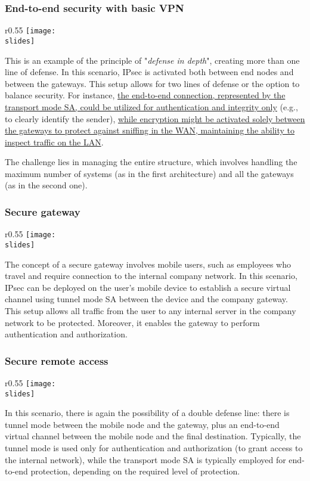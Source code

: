 \subsubsection{End-to-end security with basic VPN}
\begin{wrapfigure}{r}{0.55\textwidth}
    \centering
    \texttt{[image: \\slides]}
\end{wrapfigure}
This is an example of the principle of "\textit{defense in depth}", creating more than one line of defense. In this scenario, IPsec is activated both between end nodes and between the gateways. This setup allows for two lines of defense or the option to balance security. For instance, \ul{the end-to-end connection, represented by the transport mode SA, could be utilized for authentication and integrity only} (e.g., to clearly identify the sender), \ul{while encryption might be activated solely between the gateways to protect against sniffing in the WAN, maintaining the ability to inspect traffic on the LAN}.

The challenge lies in managing the entire structure, which involves handling the maximum number of systems (as in the first architecture) and all the gateways (as in the second one).




\subsubsection{Secure gateway}
\begin{wrapfigure}{r}{0.55\textwidth}
    \centering
    \texttt{[image: \\slides]}
\end{wrapfigure}
The concept of a secure gateway involves mobile users, such as employees who travel and require connection to the internal company network. In this scenario, IPsec can be deployed on the user's mobile device to establish a secure virtual channel using tunnel mode SA between the device and the company gateway. This setup allows all traffic from the user to any internal server in the company network to be protected. Moreover, it enables the gateway to perform authentication and authorization.


\subsubsection{Secure remote access}
\begin{wrapfigure}{r}{0.55\textwidth}
    \centering
    \texttt{[image: \\slides]}
\end{wrapfigure}
In this scenario, there is again the possibility of a double defense line: there is tunnel mode between the mobile node and the gateway, plus an end-to-end virtual channel between the mobile node and the final destination. Typically, the tunnel mode is used only for authentication and authorization (to grant access to the internal network), while the transport mode SA is typically employed for end-to-end protection, depending on the required level of protection.



